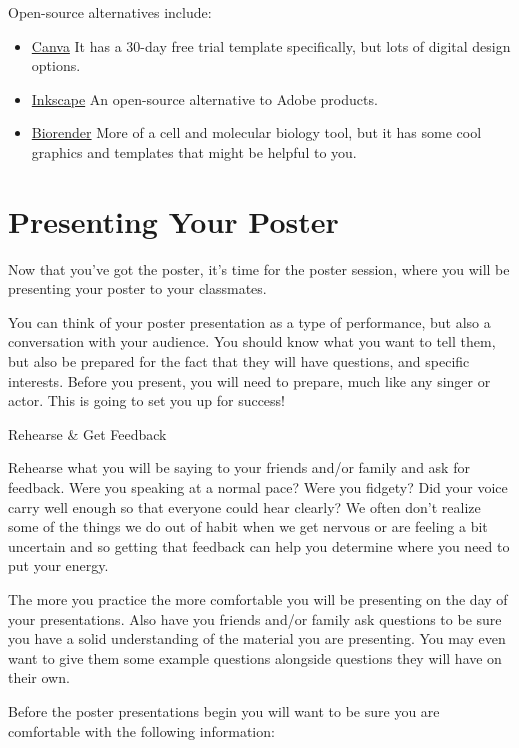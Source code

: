 \documentclass[
]{book}
\providecommand{\tightlist}{%
  \setlength{\itemsep}{0pt}\setlength{\parskip}{0pt}}
\begin{document}
Open-source alternatives include:

\begin{itemize}
\tightlist
\item
  \href{https://www.canva.com/}{Canva} It has a 30-day free trial template specifically, but lots of digital design options.
\item
  \href{https://inkscape.org/}{Inkscape} An open-source alternative to Adobe products.
\item
  \href{https://biorender.com/}{Biorender} More of a cell and molecular biology tool, but it has some cool graphics and templates that might be helpful to you.
\end{itemize}

\hypertarget{presenting-your-poster}{%
\chapter*{Presenting Your Poster}\label{presenting-your-poster}}

Now that you've got the poster, it's time for the poster session, where you will be presenting your poster to your classmates.

You can think of your poster presentation as a type of performance, but also a conversation with your audience. You should know what you want to tell them, but also be prepared for the fact that they will have questions, and specific interests. Before you present, you will need to prepare, much like any singer or actor. This is going to set you up for success!

Rehearse \& Get Feedback

Rehearse what you will be saying to your friends and/or family and ask for feedback. Were you speaking at a normal pace? Were you fidgety? Did your voice carry well enough so that everyone could hear clearly? We often don't realize some of the things we do out of habit when we get nervous or are feeling a bit uncertain and so getting that feedback can help you determine where you need to put your energy.

The more you practice the more comfortable you will be presenting on the day of your presentations. Also have you friends and/or family ask questions to be sure you have a solid understanding of the material you are presenting. You may even want to give them some example questions alongside questions they will have on their own.

Before the poster presentations begin you will want to be sure you are comfortable with the following information:
\end{document}
